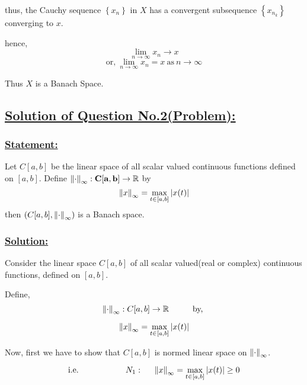 \documentclass[a4paper,12pt]{article}
\begin{document}
    thus, the Cauchy sequence $\left\{x_n\right\}$ in $X$ has a convergent subsequence $\left\{x_{n_k}\right\}$ converging to $x$.

    hence,
    \[\lim_{n\to \infty} x_n \to x\]
    \[\mbox{or,}\ \lim_{n\to \infty}x_n = x\ \mbox{as}\ n\to \infty\]
    \begin{center}
        Thus $X$ is a Banach Space.
    \end{center}
    
    \pagebreak

    \subsection*{\underline{Solution of Question No.2(Problem):}}

    \subsubsection*{\underline{{\bf Statement:}}}

    Let $C[a,b]$ be the linear space of all scalar valued continuous functions defined on $[a,b]$. Define $\mathbf{\norm{\cdot}_{\infty} : C[a,b] \to \mathbb{R}}$ by 
        \[\norm{x}_{\infty} = \displaystyle \max_{t \in [a,b]} |x(t)|\] 
        then $\left(C[a,b],\norm{\cdot}_{\infty}\right)$ is a Banach space.

    \vspace*{0.5cm}

    \subsubsection*{\underline{{\bf Solution:}}}

    Consider the linear space $C[a,b]$ of all scalar valued(real or complex) continuous functions, defined on $[a,b]$.

    Define,
    \[\norm{\cdot}_{\infty} : C[a,b]\to \mathbb{R} \hspace*{1cm}  \mbox{by,}\ \]

    \[\norm{x}_{\infty} = \displaystyle \max_{t \in [a,b]} |x(t)| \]

    \begin{center}
        \def\svgwidth{8cm}
    
    \end{center}

    Now, first we have to show that $C[a,b]$ is normed linear space on $\norm{\cdot}_{\infty}$.

    \[\mbox{i.e.}\hspace*{2cm} N_1: \hspace*{0.5cm} \norm{x}_{\infty} = \displaystyle \max_{t \in [a,b]} |x(t)| \geq 0\]
\end{document}

